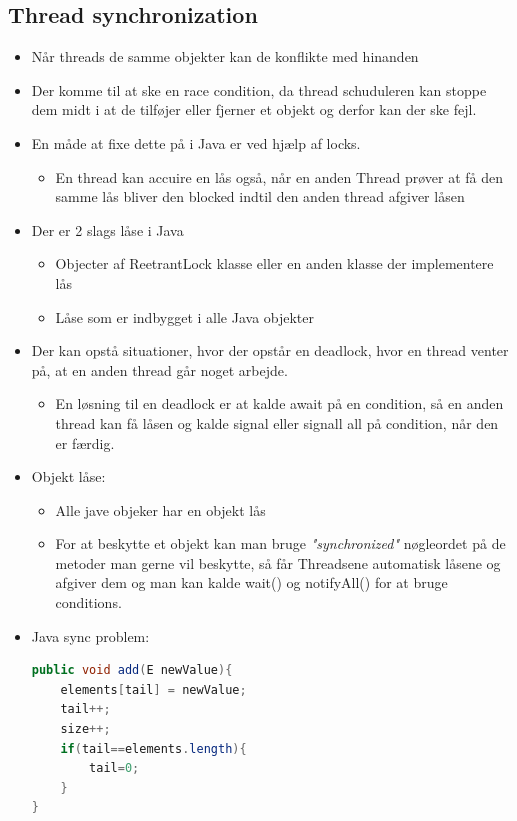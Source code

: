 \documentclass{article}
\begin{document}
\subsection{Thread synchronization}
\begin{itemize}
	\item Når threads de samme objekter kan de konflikte med hinanden
	\item Der komme til at ske en race condition, da thread schuduleren kan stoppe dem midt i at de tilføjer eller fjerner et objekt og derfor kan der ske fejl.
	\item En måde at fixe dette på i Java er ved hjælp af locks. 
	\begin{itemize}
		\item En thread kan accuire en lås også, når en anden Thread prøver at få den samme lås bliver den blocked indtil den anden thread afgiver låsen
	\end{itemize}
	\item Der er 2 slags låse i Java
	\begin{itemize}
		\item Objecter af ReetrantLock klasse eller en anden klasse der implementere lås
		\item Låse som er indbygget i alle Java objekter 
	\end{itemize}
	\item Der kan opstå situationer, hvor der opstår en deadlock, hvor en thread venter på, at en anden thread går noget arbejde. 
	\begin{itemize}
		\item En løsning til en deadlock er at kalde await på en condition, så en anden thread kan få låsen og kalde signal eller signall all på condition, når den er færdig.
	\end{itemize}
	\item Objekt låse:
	\begin{itemize}
		\item Alle jave objeker har en objekt lås
		\item For at beskytte et objekt kan man bruge \textit{"synchronized"} nøgleordet på de metoder man gerne vil beskytte, så får Threadsene automatisk låsene og afgiver dem og man kan kalde wait() og notifyAll() for at bruge conditions. 
	\end{itemize}
	\item Java sync problem:
\begin{lstlisting}[language=java]
public void add(E newValue){
	elements[tail] = newValue;
	tail++;
	size++;
	if(tail==elements.length){
		tail=0;
	}
}
\end{lstlisting}


\end{itemize}
\end{document}
